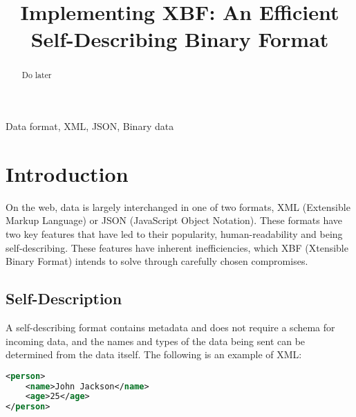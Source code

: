 \documentclass[conference]{IEEEtran}
\begin{document}
\title{Implementing XBF: An Efficient Self-Describing Binary Format}

\author{
	\and
}

\maketitle

\begin{abstract}
	Do later
\end{abstract}

\begin{IEEEkeywords}
	Data format, XML, JSON, Binary data
\end{IEEEkeywords}

\section{Introduction}

On the web, data is largely interchanged in one of two formats, XML (Extensible Markup Language)\cite{xml_spec} or JSON (JavaScript Object Notation)\cite{json_spec}. These formats have two key features that have led to their popularity, human-readability and being self-describing. These features have inherent inefficiencies, which XBF (Xtensible Binary Format) intends to solve through carefully chosen compromises.

\subsection{Self-Description}

A self-describing format contains metadata and does not require a schema for incoming data, and the names and types of the data being sent can be determined from the data itself. The following is an example of XML:

\begin{lstlisting}[language=XML]
<person>
	<name>John Jackson</name>
	<age>25</age>
</person>
\end{lstlisting}
\end{document}
